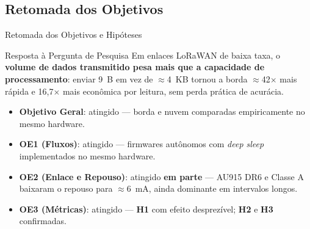 \documentclass[
    aspectratio=169,
    11pt,
    brazil
]{beamer}
\begin{document}
\subsection{Retomada dos Objetivos}
\begin{frame}{Retomada dos Objetivos e Hipóteses}
  \begin{block}{Resposta à Pergunta de Pesquisa}
    \scriptsize Em enlaces LoRaWAN de baixa taxa, o \textbf{volume de dados transmitido pesa mais que a capacidade de processamento}: enviar 9~B em vez de $\approx$4~KB tornou a borda $\approx$42$\times$ mais rápida e 16,7$\times$ mais econômica por leitura, sem perda prática de acurácia.
  \end{block}
  \vspace{0.08cm}
  \begin{itemize}\scriptsize
    \setlength{\itemsep}{2.5pt}
    \item \textbf{Objetivo Geral}: atingido --- borda e nuvem comparadas empiricamente no mesmo hardware.
    \item \textbf{OE1 (Fluxos)}: atingido --- firmwares autônomos com \textit{deep sleep} implementados no mesmo hardware.
    \item \textbf{OE2 (Enlace e Repouso)}: atingido \textbf{em parte} --- AU915 DR6 e Classe A baixaram o repouso para $\approx$6~mA, ainda dominante em intervalos longos.
    \item \textbf{OE3 (Métricas)}: atingido --- \textbf{H1} com efeito desprezível; \textbf{H2} e \textbf{H3} confirmadas.
  \end{itemize}
\end{frame}
\end{document}
